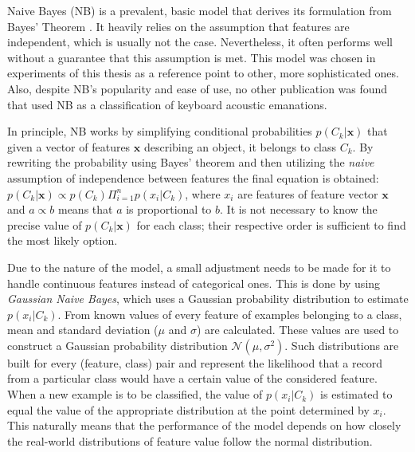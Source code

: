 \documentclass[../main.tex]{subfiles}
\begin{document}
Naive Bayes (NB) is a prevalent, basic model that derives its formulation from Bayes' Theorem \cite{naive_bayes_main}. It heavily relies on the assumption that features are independent, which is usually not the case. Nevertheless, it often performs well \cite{naive_bayes_application_med, naive_bayes_application_soil} without a guarantee that this assumption is met.
This model was chosen in experiments of this thesis as a reference point to other, more sophisticated ones. Also, despite NB's popularity and ease of use, no other publication was found that used NB as a classification of keyboard acoustic emanations.  

In principle, NB works by simplifying conditional probabilities $p(C_k | \textbf{x})$ that given a vector of features $\textbf{x}$ describing an object, it belongs to class $C_k$. By rewriting the probability using Bayes' theorem and then utilizing the \textit{naive} assumption of independence between features the final equation is obtained: $p(C_k | \textbf{x}) \propto p(C_k) \Pi_{i=1}^np(x_i | C_k)$, where $x_i$ are features of feature vector $\textbf{x}$ and $a \propto b$ means that $a$ is proportional to $b$. It is not necessary to know the precise value of $p(C_k | \textbf{x})$ for each class; their respective order is sufficient to find the most likely option.

Due to the nature of the model, a small adjustment needs to be made for it to handle continuous features instead of categorical ones. This is done by using \textit{Gaussian Naive Bayes}, which uses a Gaussian probability distribution to estimate $p(x_i | C_k)$. From known values of every feature of examples belonging to a class, mean and standard deviation ($\mu$ and $\sigma$) are calculated. These values are used to construct a Gaussian probability distribution $\mathcal{N}(\mu, \sigma^2)$. Such distributions are built for every (feature, class) pair and represent the likelihood that a record from a particular class would have a certain value of the considered feature. When a new example is to be classified, the value of $p(x_i | C_k)$ is estimated to equal the value of the appropriate distribution at the point determined by $x_i$. This naturally means that the performance of the model depends on how closely the real-world distributions of feature value follow the normal distribution.
\end{document}
